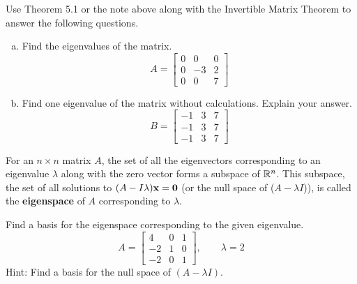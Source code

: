 \begin{exercise} %
	Use Theorem 5.1 or the note above along with the Invertible Matrix Theorem to answer the following questions.
	\begin{multicols}{2}
		\begin{enumerate}[(a)]
			\item Find the eigenvalues of the matrix.
			$$A=\begin{bmatrix}0&0&0\\0&-3&2\\0&0&7\end{bmatrix}$$
			\columnbreak 
			\item Find one eigenvalue of the matrix without calculations. Explain your answer.
			$$B=\begin{bmatrix}-1&3&7\\-1&3&7\\-1&3&7\end{bmatrix}$$
		\end{enumerate}
	\end{multicols}
\end{exercise}
\vfill


\begin{boxme}
	For an $n\times n$ matrix $A$, the set of all the eigenvectors corresponding to an eigenvalue $\lambda$ along with the zero vector forms a subspace of $\mathbb{R}^n$. This subspace, the set of all solutions to $(A-I\lambda)\boldsymbol{\mathbf{x}}=\boldsymbol{\mathbf{0}}$ (or the null space of ($A-\lambda I$)), is called the \textbf{eigenspace} of $A$ corresponding to $\lambda$.
\end{boxme}

\begin{exercise} %
	Find a basis for the eigenspace corresponding to the given eigenvalue.
	$$ A = \begin{bmatrix}4&0&1\\-2&1&0\\-2&0&1\end{bmatrix}, \qquad \lambda = 2 $$
	Hint: Find a basis for the null space of $(A-\lambda I)$.
\end{exercise}
\vfill



